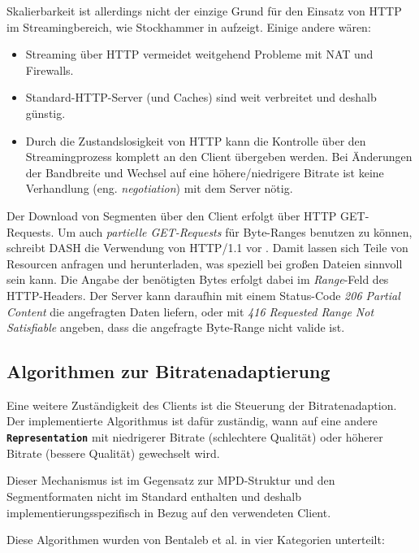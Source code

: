 \documentclass[paper = a4, fontsize = 12pt, parskip = half]{scrartcl} %
\def\elem#1{\texttt{\textbf{#1}}}
\begin{document}
Skalierbarkeit ist allerdings nicht der einzige Grund für den Einsatz von HTTP im Streamingbereich, wie Stockhammer in \cite{stockhammer_dynamic_2011} aufzeigt. Einige andere wären: 

\begin{itemize}
	\item Streaming über HTTP vermeidet weitgehend Probleme mit NAT und Firewalls.
	\item Standard-HTTP-Server (und Caches) sind weit verbreitet und deshalb günstig.
	\item Durch die Zustandslosigkeit von HTTP kann die Kontrolle über den Streamingprozess komplett an den Client übergeben werden. Bei Änderungen der Bandbreite und Wechsel auf eine höhere/niedrigere Bitrate ist keine Verhandlung (eng. \textit{negotiation}) mit dem Server nötig.
\end{itemize}

Der Download von Segmenten über den Client erfolgt über HTTP GET-Requests. Um auch \textit{partielle GET-Requests} für Byte-Ranges benutzen zu können, schreibt DASH die Verwendung von HTTP/1.1 vor \cite{international_organization_for_standardization_isoiec_nodate}.
Damit lassen sich Teile von Resourcen anfragen und herunterladen, was speziell bei großen Dateien sinnvoll sein kann. Die Angabe der benötigten Bytes erfolgt dabei im \textit{Range}-Feld des HTTP-Headers. Der Server kann daraufhin mit einem Status-Code \textit{206 Partial Content} die angefragten Daten liefern, oder mit \textit{416 Requested Range Not Satisfiable} angeben, dass die angefragte Byte-Range nicht valide ist. \cite{krishnamurthy_key_1999}

\subsection{Algorithmen zur Bitratenadaptierung}
Eine weitere Zuständigkeit des Clients ist die Steuerung der Bitratenadaption. Der implementierte Algorithmus ist dafür zuständig, wann auf eine andere \elem{Representation} mit niedrigerer Bitrate (schlechtere Qualität) oder höherer Bitrate (bessere Qualität) gewechselt wird.

Dieser Mechanismus ist im Gegensatz zur MPD-Struktur und den Segmentformaten nicht im Standard enthalten und deshalb implementierungsspezifisch in Bezug auf den verwendeten Client.

Diese Algorithmen wurden von Bentaleb et al. \cite{bentaleb_survey_2019} in vier Kategorien unterteilt:
\end{document}

